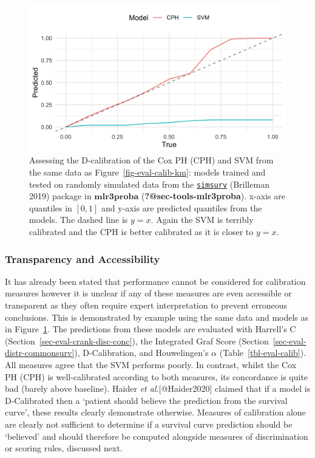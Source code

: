 \documentclass[
  letterpaper,
]{scrbook}
\theoremstyle{plain}
\theoremstyle{definition}
\theoremstyle{remark}
\begin{document}
\begin{figure}

{\centering \includegraphics{./images/evaluation/dcalib.png}

}

\caption{\label{fig-eval-dcalib}Assessing the D-calibration of the Cox
PH (CPH) and SVM from the same data as Figure~\ref{fig-eval-calib-km}:
models trained and tested on randomly simulated data from the
\href{https://cran.r-project.org/package=simsurv}{\texttt{simsurv}}
(Brilleman 2019) package in \(\textbf{mlr3proba}\)
(\textbf{?@sec-tools-mlr3proba}). x-axis are quantiles in \([0,1]\) and
y-axis are predicted quantiles from the models. The dashed line is
\(y = x\). Again the SVM is terribly calibrated and the CPH is better
calibrated as it is closer to \(y = x\).}

\end{figure}

\hypertarget{transparency-and-accessibility}{%
\subsubsection{Transparency and
Accessibility}\label{transparency-and-accessibility}}

It has already been stated that performance cannot be considered for
calibration measures however it is unclear if any of these measures are
even accessible or transparent as they often require expert
interpretation to prevent erroneous conclusions. This is demonstrated by
example using the same data and models as in
Figure~\ref{fig-eval-dcalib}. The predictions from these models are
evaluated with Harrell's C (Section~\ref{sec-eval-crank-disc-conc}), the
Integrated Graf Score (Section~\ref{sec-eval-distr-commonsurv}),
D-Calibration, and Houwelingen's \(\alpha\)
(Table~\ref{tbl-eval-calib}). All measures agree that the SVM performs
poorly. In contrast, whilst the Cox PH (CPH) is well-calibrated
according to both measures, its concordance is quite bad (barely above
baseline). Haider \textit{et al.}[@Haider2020] claimed that if a model
is D-Calibrated then a `patient should believe the prediction from the
survival curve', these results clearly demonstrate otherwise. Measures
of calibration alone are clearly not sufficient to determine if a
survival curve prediction should be `believed' and should therefore be
computed alongside measures of discrimination or scoring rules,
discussed next.
\end{document}
